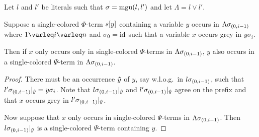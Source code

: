 \documentclass[,%
	draft=false,%
	numbers=noendperiod
	11pt,
	a4paper,
	oneside,%
	openany,
]{memoir}
\begin{document}
\begin{comment}
	\begin{lemma}
		Let $l$ and $l'$ be literals such that $\sigma = \mgu(l, l')$
		and let $\Lambda = l\lor l'$.

		Suppose a single-colored $\Phi$-term $s\occ{y}$ containing a variable $y$ occurs in $\Lambda\sigmaz{i-1}$ where $1\varleq i \varleq n$ and $\sigma_0 = \id$ such that 
		a variable $x$ occurs grey in $y\sigma_i$.
		Then in $\Lambda\sigmazi$, there is an occurrence of $x$ of at least one of the following forms:
		\begin{enumerate}
			\item A grey occurrence
			\item An occurrence in a single-colored $\Phi$-term
			\item [ col change ]
		\end{enumerate}

	\end{lemma}
\end{comment}

\begin{lemma}
	Let $l$ and $l'$ be literals such that $\sigma = \operatorname{mgu}(l, l')$
	and let $\Lambda = l\lor l'$.

	Suppose a single-colored $\Phi$-term $s[y]$ containing a variable $y$ occurs in $\Lambda\sigma_{(0,i-1)}$ where $1\varleq i \varleq n$ and $\sigma_0 = \operatorname{id}$ such that 
	a variable $x$ occurs grey in $y\sigma_i$.

	Then if $x$ only occurs only in single-colored $\Psi$-terms in $\Lambda\sigma_{(0,i-1)}$, $y$ also occurs in a single-colored $\Psi$-term in $\Lambda\sigma_{(0,i-1)}$.
\end{lemma}
\begin{proof}
	There must be an occurrence $\bm\hat y$ of $y$, say w.l.o.g.\ in $l\sigma_{(0,i-1)}$,
	such that $l'\sigma_{(0,i-1)}|_{\bm\hat y} = y\sigma_i$.
	Note that $l\sigma_{(0,i-1)}|_{\bm\hat y}$ and $l'\sigma_{(0,i-1)}|_{\bm\hat y}$ agree on the prefix and that $x$ occurs grey in $l'\sigma_{(0,i-1)}|_{\bm\hat y}$.

	Now suppose that $x$ only occurs in single-colored $\Psi$-terms in $\Lambda\sigma_{(0,i-1)}$.
	Then $l\sigma_{(0,i-1)}|_{\bm\hat y}$ is a single-colored $\Psi$-term containing $y$.
\end{proof}
\end{document}
